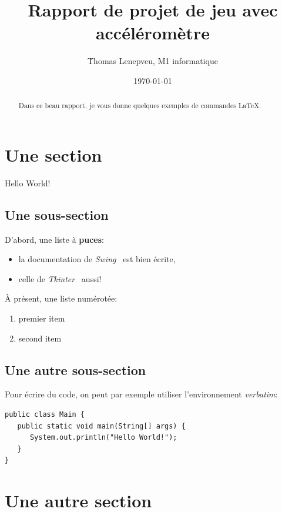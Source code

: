 \documentclass{article}
\title{Rapport de projet de jeu avec accéléromètre}
\author{\'Thomas Lenepveu, M1 informatique}
\date{\today}
\begin{document}
\maketitle %


\begin{abstract}
  Dans ce beau rapport, je vous donne quelques exemples
  de commandes \LaTeX.
\end{abstract}

\section{Une section}
\label{section:hello} %

Hello World!

\subsection{Une sous-section}
D'abord, une liste à \textbf{puces}:
\begin{itemize}
\item la documentation de \textit{Swing}~\cite{swingDoc}
  est bien écrite,
\item celle de \textit{Tkinter}~\cite{tkinterDoc} aussi!
\end{itemize}

\`A présent, une liste numérotée:
\begin{enumerate}
\item premier item
\item second item
\end{enumerate}

\subsection{Une autre sous-section}
Pour écrire du code, on peut par exemple utiliser l'environnement
\textit{verbatim}:
\begin{verbatim}
public class Main {
   public static void main(String[] args) {
      System.out.println("Hello World!");
   }
}
\end{verbatim}

\section{Une autre section}
\end{document}
